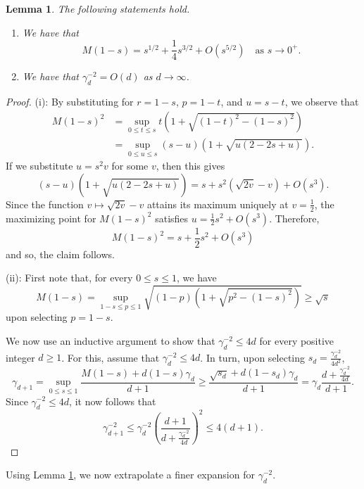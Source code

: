 \documentclass[10pt]{amsart}
\newtheorem{lemma}[theorem]{Lemma}
\begin{document}
\begin{lemma}\label{l:asy-1}
    The following statements hold.
    \begin{enumerate}[{\rm (i)}]
        \item We have that
        \[
            M(1-s) = s^{1/2}+\frac{1}{4}s^{3/2} + O(s^{5/2}) \quad \text{as $s\rightarrow0^+$}.
        \]
        \item We have that $\gamma_d^{-2} = O(d)$ as $d\rightarrow\infty$.
    \end{enumerate}
\end{lemma}

\begin{proof}
    (i): By substituting for $r=1-s$, $p=1-t$, and $u=s-t$, we observe that
    \begin{align*}
        M(1-s)^2 & = \sup_{0\leq t\leq s}t\left( 1 + \sqrt{(1-t)^2 - (1-s)^2} \right)\\
        & = \sup_{0\leq u\leq s}(s-u)\left(1+ \sqrt{u(2-2s+u)} \right).
    \end{align*}
    If we substitute $u=s^2v$ for some $v$, then this gives
    \[
        (s-u)\left(1+\sqrt{u(2-2s+u)}\right) = s + s^2\left(\sqrt{2v}-v\right)+O(s^3).
    \]
    Since the function $v\mapsto \sqrt{2v}-v$ attains its maximum uniquely at $v= \frac{1}{2}$, the maximizing point for $M(1-s)^2$ satisfies $u = \frac{1}{2}s^2 + O(s^3)$. Therefore,
    \[
        M(1-s)^2 = s + \frac{1}{2}s^2 + O(s^3)
    \]
    and so, the claim follows.

    (ii): First note that, for every $0\leq s\leq1$, we have
    \[
        M(1-s) = \sup_{1-s\leq p\leq 1} \sqrt{(1-p)\left(1+\sqrt{p^2-(1-s)^2}\right)} \geq \sqrt{s}
    \]
    upon selecting $p=1-s$.
    
    We now use an inductive argument to show that $\gamma_d^{-2} \leq 4d$ for every positive integer $d\geq1$. For this, assume that $\gamma_d^{-2}\leq 4d$.  In turn, upon selecting $s_d = \frac{\gamma_d^{-2}}{4d^2}$,
    \[
        \gamma_{d+1}  = \sup_{0\leq s\leq 1} \frac{M(1-s) + d(1-s)\gamma_d}{d+1}\geq \frac{\sqrt{s_d}+d(1-s_d)\gamma_d}{d+1} = \gamma_d \frac{d+\frac{\gamma_d^{-2}}{4d}}{d+1}.
    \]
    Since $\gamma_d^{-2}\leq 4d$, it now follows that
    \[
        \gamma_{d+1}^{-2}\leq \gamma_d^{-2}\left( \frac{d+1}{d+\frac{\gamma_d^{-2}}{4d}}\right)^2 \leq 4(d+1).
    \]
\end{proof}

Using Lemma \ref{l:asy-1}, we now extrapolate a finer expansion for $\gamma_d^{-2}$.
\end{document}
